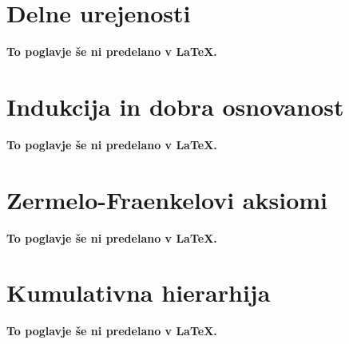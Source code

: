 \documentclass[11pt,a4paper]{book}
\begin{document}
\chapter{Delne urejenosti}
\textbf{To poglavje še ni predelano v {\LaTeX}.}
%

\chapter{Indukcija in dobra osnovanost}
\textbf{To poglavje še ni predelano v {\LaTeX}.}
%



\chapter{Zermelo-Fraenkelovi aksiomi}
\textbf{To poglavje še ni predelano v {\LaTeX}.}
%

\chapter{Kumulativna hierarhija}
\textbf{To poglavje še ni predelano v {\LaTeX}.}
%


% 





{
\raggedright
\renewcommand{\markboth}[2]{}

}
\end{document}
